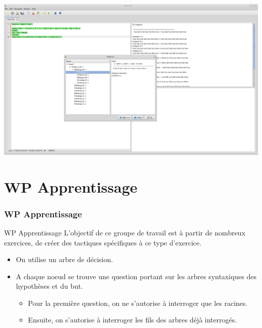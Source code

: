 \documentclass[slidetop]{beamer}
\begin{document}
\begin{frame}
\includegraphics[width=1\textwidth]{ltacdebug.png}
\end{frame}

\section{WP Apprentissage}
\begin{frame}
\frametitle{WP Apprentissage} 
WP Apprentissage
L'objectif de ce groupe de travail est à partir de nombreux exercices, de créer des tactiques spécifiques à ce type d'exercice.
\end{frame}
\begin{frame}

\begin{itemize}
    \item On utilise un arbre de décision. 
    \item A chaque noeud se trouve une question portant sur les arbres syntaxiques des hypothèses et du but. 
\begin{itemize}
    \item Pour la première question, on ne s'autorise à interroger que les racines.
    \item Ensuite, on s'autorise à interroger les fils des arbres déjà interrogés.
\end{itemize}
\end{itemize}

\end{frame}
\end{document}
